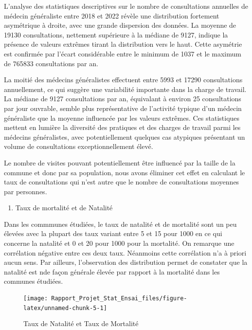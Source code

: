 \documentclass[
]{article}
\providecommand{\tightlist}{%
  \setlength{\itemsep}{0pt}\setlength{\parskip}{0pt}}
\begin{document}
L'analyse des statistiques descriptives sur le nombre de consultations
annuelles de médecin généraliste entre 2018 et 2022 révèle une
distribution fortement asymétrique à droite, avec une grande dispersion
des données. La moyenne de 19130 consultations, nettement supérieure à
la médiane de 9127, indique la présence de valeurs extrêmes tirant la
distribution vers le haut. Cette asymétrie est confirmée par l'écart
considérable entre le minimum de 1037 et le maximum de 765833
consultations par an.

La moitié des médecins généralistes effectuent entre 5993 et 17290
consultations annuellement, ce qui suggère une variabilité importante
dans la charge de travail. La médiane de 9127 consultations par an,
équivalant à environ 25 consultations par jour ouvrable, semble plus
représentative de l'activité typique d'un médecin généraliste que la
moyenne influencée par les valeurs extrêmes. Ces statistiques mettent en
lumière la diversité des pratiques et des charges de travail parmi les
médecins généralistes, avec potentiellement quelques cas atypiques
présentant un volume de consultations exceptionnellement élevé.

Le nombre de visites pouvant potentiellement être influencé par la
taille de la commune et donc par sa population, nous avons éliminer cet
effet en calculant le taux de consultations qui n'est autre que le
nombre de consultations moyennes par personnes.

\begin{enumerate}
\def\labelenumi{\arabic{enumi}.}
\setcounter{enumi}{1}
\tightlist
\item
  Taux de mortalité et de Natalité
\end{enumerate}

Dans les commmunes étudiées, le taux de natalité et de mortalité sont un
peu élevées avec la plupart des taux variant entre 5 et 15 pour 1000 en
ce qui concerne la natalité et 0 et 20 pour 1000 pour la mortalité. On
remarque une corrélation négative entre ces deux taux. Néanmoins cette
corrélation n'a à priori aucun sens. Par ailleurs, l'observation des
distribution permet de constater que la natalité est nde façon générale
élevée par rapport à la mortalité dans les communes étudiées.

\begin{figure}

{\centering \texttt{[image: Rapport\_Projet\_Stat\_Ensai\_files/figure-latex/unnamed-chunk-5-1]} 

}

\caption{Taux de Natalité et Taux de Mortalité}\label{fig:unnamed-chunk-5}
\end{figure}
\end{document}
